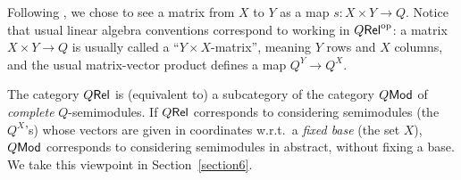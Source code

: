  \begin{remark}
 Following \cite{Manzo2013, Hofmann2014, Ehrhard2005}, we 
 chose to see a matrix from $X$ to $Y$ as a map $s:X\times Y\to Q$.
% 
Notice that usual linear algebra conventions correspond to working in $Q \mathsf{Rel}^{\mathrm{op}}$: a matrix $X\times Y\to Q$ is usually called a ``$Y\times X$-matrix'', meaning $Y$ rows and $X$ columns, and the usual matrix-vector product defines a map $Q^Y\to Q^X$.
\end{remark}
%
%
%
%

\begin{remark}
 The category $Q \mathsf{Rel}$ is (equivalent to) a subcategory of the category $Q\mathsf{Mod}$ of \emph{complete} $Q$-semimodules.
 If $Q \mathsf{Rel}$ corresponds to considering semimodules (the $Q^X$'s) whose vectors are given in coordinates w.r.t.\ a \emph{fixed base} (the set $X$), $Q\mathsf{Mod}$ corresponds to considering semimodules in abstract, without fixing a base.
 We take this viewpoint in Section~\ref{section6}.
\end{remark}


